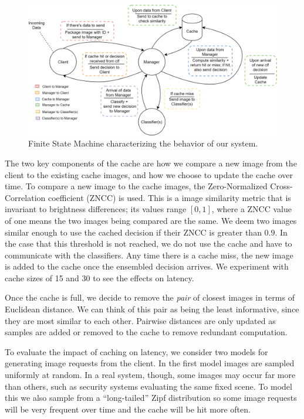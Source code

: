 \documentclass[11pt]{article}
\begin{document}
\begin{figure}[t]
    \centering
    \includegraphics[scale=0.15]{FSM.png}
    \caption{Finite State Machine characterizing the behavior of our system.}
    \label{fig:fsm}
\end{figure}

The two key components of the cache are how we compare a new image from the client to the existing cache images, and how we choose to update the cache over time. To compare a new image to the cache images, the Zero-Normalized Cross-Correlation coefficient (ZNCC) is used. This is a image similarity metric that is invariant to brightness differences; its values range $[0,1]$, where a ZNCC value of one means the two images being compared are the same. We deem two images similar enough to use the cached decision if their ZNCC is greater than $0.9$. In the case that this threshold is not reached, we do not use the cache and have to communicate with the classifiers. Any time there is a cache miss, the new image is added to the cache once the ensembled decision arrives. We experiment with cache sizes of 15 and 30 to see the effects on latency. 

Once the cache is full, we decide to remove the \emph{pair} of closest images in terms of Euclidean distance. We can think of this pair as being the least informative, since they are most similar to each other. Pairwise distances are only updated as samples are added or removed to the cache to remove redundant computation.

To evaluate the impact of caching on latency, we consider two models for generating image requests from the client. In the first model images are sampled uniformly at random. In a real system, though, some images may occur far more than others, such as security systems evaluating the same fixed scene. To model this we also sample from a ``long-tailed'' Zipf distribution so some image requests will be very frequent over time and the cache will be hit more often.
\end{document}
